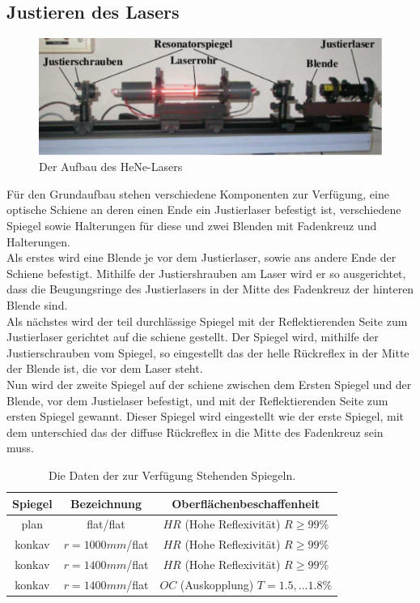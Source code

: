 \subsection{Justieren des Lasers}
\begin{figure}[h!]
\centering
\includegraphics[scale=0.75]{../Grafiken/Aufbau.pdf}
\caption{Der Aufbau des HeNe-Lasers\cite{V61}}\label{Aufbau}
\end{figure}
Für den Grundaufbau stehen verschiedene Komponenten zur Verfügung, eine optische Schiene an deren einen Ende ein Justierlaser befestigt ist, verschiedene Spiegel sowie Halterungen für diese und zwei Blenden mit Fadenkreuz und Halterungen.\\ 
Als erstes wird eine Blende je vor dem Justierlaser, sowie ans andere Ende der Schiene befestigt. Mithilfe der Justiershrauben am Laser wird er so ausgerichtet, dass die Beugungsringe des Justierlasers in der Mitte des Fadenkreuz der hinteren Blende sind.\\
Als nächstes wird der teil durchlässige Spiegel mit der Reflektierenden Seite zum Justierlaser gerichtet auf die schiene gestellt. Der Spiegel wird, mithilfe der Justierschrauben vom Spiegel, so eingestellt das der helle Rückreflex in der Mitte der Blende ist, die vor dem Laser steht.\\ 
Nun wird der zweite Spiegel auf der schiene zwischen dem Ersten Spiegel und der Blende, vor dem Justielaser befestigt, und mit der Reflektierenden Seite zum ersten Spiegel gewannt. Dieser Spiegel wird eingestellt wie der erste Spiegel, mit dem unterschied das der diffuse Rückreflex in die Mitte des Fadenkreuz sein muss. 

\begin{table}
\centering
\begin{tabular}{c c c}
Spiegel & Bezeichnung & Oberflächenbeschaffenheit \\\hline
plan & flat/flat & $HR$ (Hohe Reflexivität) $R\ge 99\%$\\
konkav & $r=1000mm$/flat & $HR$ (Hohe Reflexivität) $R\ge 99\%$\\
konkav & $r=1400mm$/flat & $HR$ (Hohe Reflexivität) $R\ge 99\%$\\
konkav & $r=1400mm$/flat & $OC$ (Auskopplung) $T=1.5,...1.8\% $
\end{tabular}
\caption{Die Daten der zur Verfügung Stehenden Spiegeln.\cite{V61}}\label{Eigenschaften}
\end{table}
